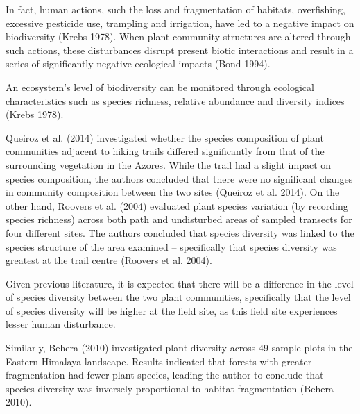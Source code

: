 \documentclass[11pt,a4paper]{article}
\begin{document}
In fact, human actions, such the loss and fragmentation of habitats, overfishing, excessive pesticide use, trampling and irrigation, have led to a negative impact on biodiversity (Krebs 1978). When plant community structures are altered through such actions, these disturbances disrupt present biotic interactions and result in a series of significantly negative ecological impacts (Bond 1994). 

An ecosystem’s level of biodiversity can be monitored through ecological characteristics such as species richness, relative abundance and diversity indices (Krebs 1978). 

Queiroz et al. (2014) investigated whether the species composition of plant communities adjacent to hiking trails differed significantly from that of the surrounding vegetation in the Azores. While the trail had a slight impact on species composition, the authors concluded that there were no significant changes in community composition between the two sites (Queiroz et al. 2014). On the other hand, Roovers et al. (2004) evaluated plant species variation (by recording species richness) across both path and undisturbed areas of sampled transects for four different sites. The authors concluded that species diversity was linked to the species structure of the area examined – specifically that species diversity was greatest at the trail centre (Roovers et al. 2004). 

Given previous literature, it is expected that there will be a difference in the level of species diversity between the two plant communities, specifically that the level of species diversity will be higher at the field site, as this field site experiences lesser human disturbance.

Similarly, Behera (2010) investigated plant diversity across 49 sample plots in the Eastern Himalaya landscape. Results indicated that forests with greater fragmentation had fewer plant species, leading the author to conclude that species diversity was inversely proportional to habitat fragmentation (Behera 2010).
\end{document}
